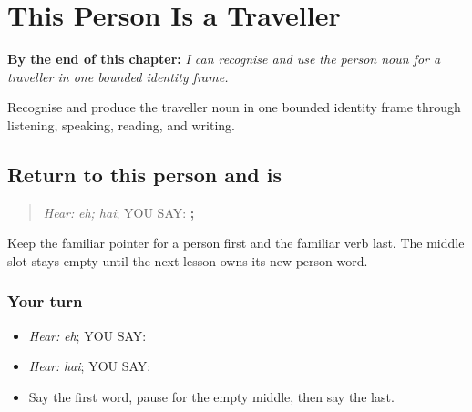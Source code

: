 
\chapter{This Person Is a Traveller}
\label{ch:pa-a2-yatri}

\begin{chapteropening}
\textbf{By the end of this chapter:} \emph{I can recognise and use the person noun for a traveller in one bounded identity frame.}

Recognise and produce the traveller noun in one bounded identity frame through listening, speaking, reading, and writing.
\end{chapteropening}

\section[\texorpdfstring{\pa{ਇਹ} · \pa{ਹੈ} (eh; hai)}{ਇਹ · ਹੈ (eh; hai)}]{Return to this person and is}

\label{lesson:PA-C202-identity-return}



\begin{quote}
\emph{Hear:} \emph{eh; hai}; YOU SAY: \textbf{; }
\end{quote}

\begin{grammarlens}[title={Grammar Lens}]
Keep the familiar pointer for a person first and the familiar verb last. The middle slot stays empty until the next lesson owns its new person word.
\end{grammarlens}

\subsection*{Your turn}
\begin{itemize}
\raggedright
  \item \emph{Hear:} \emph{eh}; YOU SAY: \textbf{}
  \item \emph{Hear:} \emph{hai}; YOU SAY: \textbf{}
  \item Say the first word, pause for the empty middle, then say the last.
\end{itemize}

